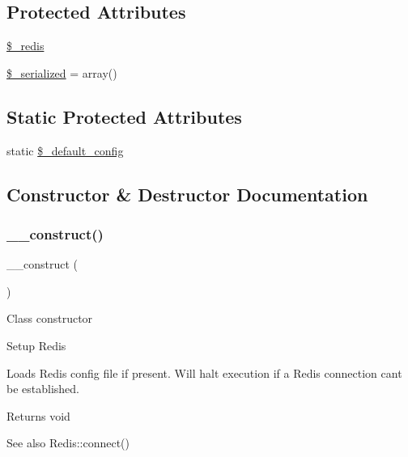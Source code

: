 \subsection*{Protected Attributes}
\begin{DoxyCompactItemize}
\item 
\mbox{\hyperlink{class_c_i___cache__redis_a36de60a8fcbe3efac91a87577d0728de}{\$\+\_\+redis}}
\item 
\mbox{\hyperlink{class_c_i___cache__redis_a138ded30ad61d04611681cdf7060a6cf}{\$\+\_\+serialized}} = array()
\end{DoxyCompactItemize}
\subsection*{Static Protected Attributes}
\begin{DoxyCompactItemize}
\item 
static \mbox{\hyperlink{class_c_i___cache__redis_afbad69596f851c659fd07255c321fb97}{\$\+\_\+default\+\_\+config}}
\end{DoxyCompactItemize}


\subsection{Constructor \& Destructor Documentation}
\mbox{\label{class_c_i___cache__redis_a095c5d389db211932136b53f25f39685}} 
\subsubsection{\texorpdfstring{\+\_\+\+\_\+construct()}{\_\_construct()}}
{\footnotesize\ttfamily \+\_\+\+\_\+construct (\begin{DoxyParamCaption}{ }\end{DoxyParamCaption})}

Class constructor

Setup Redis

Loads Redis config file if present. Will halt execution if a Redis connection can\textquotesingle{}t be established.

\begin{DoxyReturn}{Returns}
void 
\end{DoxyReturn}
\begin{DoxySeeAlso}{See also}
Redis\+::connect() 
\end{DoxySeeAlso}
\mbox{\label{class_c_i___cache__redis_a421831a265621325e1fdd19aace0c758}} 
